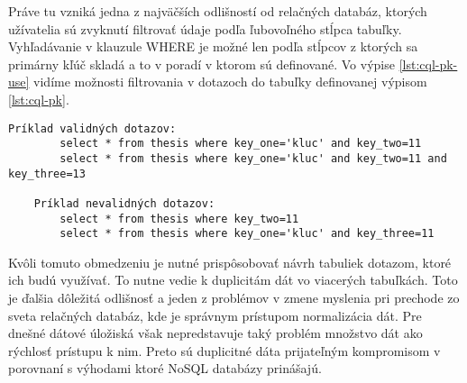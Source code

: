 	Práve tu vzniká jedna z najväčších odlišností od relačných databáz, ktorých užívatelia sú zvyknutí filtrovať údaje podľa ľubovoľného stĺpca tabuľky. Vyhľadávanie v klauzule WHERE je možné len podľa stĺpcov z ktorých sa primárny kľúč skladá a to v poradí v ktorom sú definované. Vo výpise \ref{lst:cql-pk-use} vidíme možnosti filtrovania v dotazoch do tabuľky definovanej výpisom \ref{lst:cql-pk}.
	
	\begin{lstlisting}[label=lst:cql-pk-use,caption=Príklad vyhľadávanie v tabuľke thesis]
	Príklad validných dotazov:
		select * from thesis where key_one='kluc' and key_two=11
		select * from thesis where key_one='kluc' and key_two=11 and key_three=13
		
	Príklad nevalidných dotazov:
		select * from thesis where key_two=11
		select * from thesis where key_one='kluc' and key_three=11
	\end{lstlisting}
	
	Kvôli tomuto obmedzeniu je nutné prispôsobovať návrh tabuliek dotazom, ktoré ich budú využívať. To nutne vedie k duplicitám dát vo viacerých tabuľkách. Toto je ďalšia dôležitá odlišnosť a jeden z problémov v zmene myslenia pri prechode zo sveta relačných databáz, kde je správnym prístupom normalizácia dát. Pre dnešné dátové úložiská však nepredstavuje taký problém množstvo dát ako rýchlosť prístupu k nim. Preto sú duplicitné dáta prijateľným kompromisom v porovnaní s výhodami ktoré NoSQL databázy prinášajú.

